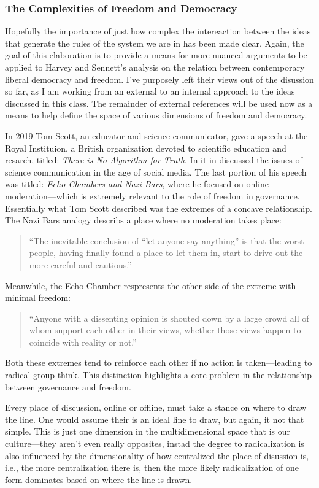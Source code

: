 \documentclass[12pt,a4paper]{article}
\begin{document}
\subsubsection{The Complexities of Freedom and Democracy}
\vspace*{-8pt}

Hopefully the importance of just how complex the intereaction between the ideas that generate the rules of the system we are in has been made clear. Again, the goal of this elaboration is to provide a means for more nuanced arguments to be applied to Harvey and Sennett's analysis on the relation between contemporary liberal democracy and freedom. I've purposely left their views out of the disussion so far, as I am working from an external to an internal approach to the ideas discussed in this class. The remainder of external references will be used now as a means to help define the space of various dimensions of freedom and democracy.

In 2019 Tom Scott, an educator and science communicator, gave a speech at the Royal Instituion, a British organization devoted to scientific education and resarch, titled: \textit{There is No Algorithm for Truth}. In it in discussed the issues of science communication in the age of social media. The last portion of his speech was titled: \textit{Echo Chambers and Nazi Bars}, where he focused on online moderation---which is extremely relevant to the role of freedom in governance. Essentially what Tom Scott described was the extremes of a concave relationship. The Nazi Bars analogy describs a place where no moderation takes place:
\begin{quote}
   \color{G-Moon}``The inevitable conclusion of ``let anyone say anything'' is that the worst people, having finally found a place to let them in, start to drive out the more careful and cautious.''~\cite{tom}
\end{quote} 
Meanwhile, the Echo Chamber respresents the other side of the extreme with minimal freedom: 
\begin{quote}
   \color{G-Moon} ``Anyone with a dissenting opinion is shouted down by a large crowd all of whom support each other in their views, whether those views happen to coincide with reality or not.''~\cite{tom}
\end{quote}
Both these extremes tend to reinforce each other if no action is taken---leading to radical group think. This distinction highlights a core problem in the relationship between governance and freedom. 

Every place of discussion, online or offline, must take a stance on where to draw the line. One would assume their is an ideal line to draw, but again, it not that simple. This is just one dimension in the multidimensional space that is our culture---they aren't even really opposites, instad the degree to radicalization is also influenced by the dimensionality of how centralized the place of disussion is, i.e., the more centralization there is, then the more likely radicalization of one form dominates based on where the line is drawn. 
\end{document}
